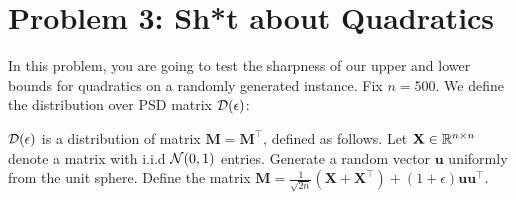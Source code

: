 \documentclass[12pt]{article}
\begin{document}
\section*{Problem 3: Sh*t about Quadratics}
	In this problem, you are going to test the sharpness of our upper and lower bounds for quadratics on a randomly generated instance. Fix $n = 500$. We define the distribution over PSD matrix ${\cal D}(\epsilon)$:
	\begin{definition} ${\cal D}(\epsilon)$ is a distribution of matrix $\mathbf{M} = \mathbf{M}^\top$, defined as follows. Let $\mathbf{X} \in \mathbb{R}^{n \times n}$ denote a matrix with i.i.d ${\cal N}(0,1)$ entries. Generate a random vector $\mathbf{u}$ uniformly from the unit sphere. Define the matrix $\mathbf{M} = \frac{1}{\sqrt{2n}}(\mathbf{X} + \mathbf{X}^{\top}) + (1+\epsilon)\mathbf{u}\mathbf{u}^\top$.
	\end{definition}
\end{document}
